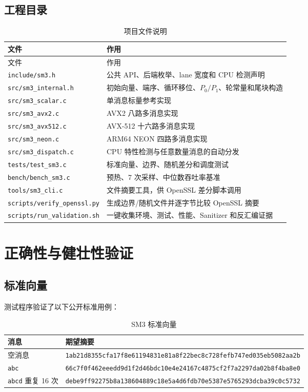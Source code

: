 \documentclass[UTF8,a4paper,12pt]{ctexart}
\newcommand{\code}[1]{\texttt{#1}}
\begin{document}
\subsection{工程目录}
{\footnotesize
\begin{longtable}{p{5.2cm}p{8.8cm}}
\caption{项目文件说明}\\
\toprule
文件 & 作用 \\
\midrule
\endfirsthead
\toprule
文件 & 作用 \\
\midrule
\endhead
\nolinkurl{include/sm3.h} & 公共 API、后端枚举、lane 宽度和 CPU 检测声明 \\
\nolinkurl{src/sm3_internal.h} & 初始向量、端序、循环移位、$P_0/P_1$、轮常量和尾块构造 \\
\nolinkurl{src/sm3_scalar.c} & 单消息标量参考实现 \\
\nolinkurl{src/sm3_avx2.c} & AVX2 八路多消息实现 \\
\nolinkurl{src/sm3_avx512.c} & AVX-512 十六路多消息实现 \\
\nolinkurl{src/sm3_neon.c} & ARM64 NEON 四路多消息实现 \\
\nolinkurl{src/sm3_dispatch.c} & CPU 特性检测与任意数量消息的自动分发 \\
\nolinkurl{tests/test_sm3.c} & 标准向量、边界、随机差分和调度测试 \\
\nolinkurl{bench/bench_sm3.c} & 预热、7 次采样、中位数吞吐率基准 \\
\nolinkurl{tools/sm3_cli.c} & 文件摘要工具，供 OpenSSL 差分脚本调用 \\
\nolinkurl{scripts/verify_openssl.py} & 生成边界/随机文件并逐字节比较 OpenSSL 摘要 \\
\nolinkurl{scripts/run_validation.sh} & 一键收集环境、测试、性能、Sanitizer 和反汇编证据 \\
\bottomrule
\end{longtable}
}

\section{正确性与健壮性验证}

\subsection{标准向量}
测试程序验证了以下公开标准用例：
\begin{table}[H]
\centering
\caption{SM3 标准向量}
\begin{tabularx}{\textwidth}{p{3.1cm}X}
\toprule
消息 & 期望摘要 \\
\midrule
空消息 & \code{1ab21d8355cfa17f8e61194831e81a8f22bec8c728fefb747ed035eb5082aa2b} \\
\code{abc} & \code{66c7f0f462eeedd9d1f2d46bdc10e4e24167c4875cf2f7a2297da02b8f4ba8e0} \\
\code{abcd} 重复 16 次 & \code{debe9ff92275b8a138604889c18e5a4d6fdb70e5387e5765293dcba39c0c5732} \\
\bottomrule
\end{tabularx}
\end{table}
\end{document}
